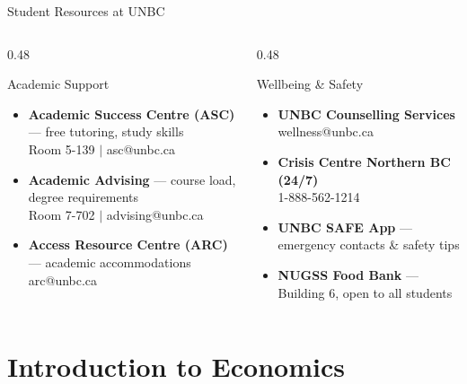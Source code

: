 \documentclass[aspectratio=169]{beamer}
\begin{document}
\begin{frame}{Student Resources at UNBC}
\transfade
\begin{columns}
  \begin{column}{0.48\textwidth}
    \begin{block}{Academic Support}
      \begin{itemize}
        \item \textbf{Academic Success Centre (ASC)} --- free tutoring, study skills \\ Room 5-139 $|$ asc@unbc.ca
        \item \textbf{Academic Advising} --- course load, degree requirements \\ Room 7-702 $|$ advising@unbc.ca
        \item \textbf{Access Resource Centre (ARC)} --- academic accommodations \\ arc@unbc.ca
      \end{itemize}
    \end{block}
  \end{column}
  \begin{column}{0.48\textwidth}
    \begin{block}{Wellbeing \& Safety}
      \begin{itemize}
        \item \textbf{UNBC Counselling Services} \\ wellness@unbc.ca
        \item \textbf{Crisis Centre Northern BC (24/7)} \\ 1-888-562-1214
        \item \textbf{UNBC SAFE App} --- emergency contacts \& safety tips
        \item \textbf{NUGSS Food Bank} --- Building 6, open to all students
      \end{itemize}
    \end{block}
  \end{column}
\end{columns}
\end{frame}

\section{Introduction to Economics}
\end{document}
